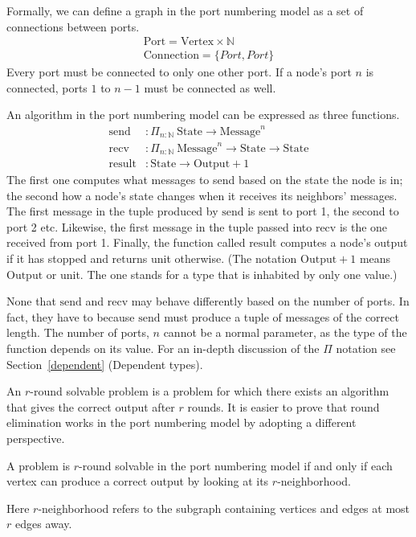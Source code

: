 \documentclass[english, 12pt, a4paper, sci, a-1b, online]{aaltothesis}
\begin{document}
Formally, we can define a graph in the port numbering model as a set of connections between ports.
\begin{align*}
  \text{Port} = \text{Vertex} \times \mathbb{N} \\
  \text{Connection} = \{Port, Port\}
\end{align*}
Every port must be connected to only one other port. If a node's port $n$ is connected, ports $1$ to $n-1$ must be connected as well.

An algorithm in the port numbering model can be expressed as three functions.
\begin{align*}
  \text{send} &: \Pi_{n : \mathbb{N}}~\text{State} \to \text{Message}^n \\
  \text{recv} &: \Pi_{n : \mathbb{N}}~\text{Message}^n \to \text{State} \to \text{State} \\
  \text{result} &: \text{State} \to \text{Output} + 1
\end{align*}
The first one computes what messages to send based on the state the node is in; the second how a node's state changes when it receives its neighbors' messages. The first message in the tuple produced by $\text{send}$ is sent to port 1, the second to port 2 etc. Likewise, the first message in the tuple passed into $\text{recv}$ is the one received from port 1. Finally, the function called $\text{result}$ computes a node's output if it has stopped and returns unit otherwise. (The notation $\text{Output} + 1$ means $\text{Output}$ or unit. The one stands for a type that is inhabited by only one value.)

None that $\text{send}$ and $\text{recv}$ may behave differently based on the number of ports. In fact, they have to because $\text{send}$ must produce a tuple of messages of the correct length. The number of ports, $n$ cannot be a normal parameter, as the type of the function depends on its value. For an in-depth discussion of the $\Pi$ notation see Section~\ref{dependent} (Dependent types).

An $r$-round solvable problem is a problem for which there exists an algorithm that gives the correct output after $r$ rounds. It is easier to prove that round elimination works in the port numbering model by adopting a different perspective.

\begin{lemma}
  A problem is $r$-round solvable in the port numbering model if and only if each vertex can produce a correct output by looking at its $r$-neighborhood.
\end{lemma}
Here $r$-neighborhood refers to the subgraph containing vertices and edges at most $r$ edges away.
\end{document}
